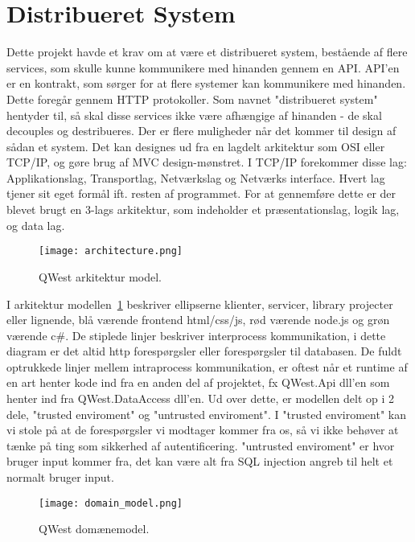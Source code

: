 \section{Distribueret System}\label{sec:distSys}
Dette projekt havde et krav om at være et distribueret system, bestående af flere services, som skulle kunne kommunikere med hinanden gennem en API. API'en er en kontrakt, som sørger for at flere systemer kan kommunikere med hinanden\cite{API}. Dette foregår gennem HTTP protokoller\cite{http}. 
Som navnet "distribueret system" hentyder til, så skal disse services ikke være afhængige af hinanden - de skal decouples\cite{decoupling} og destribueres. Der er flere muligheder når det kommer til design af sådan et system. Det kan designes ud fra en lagdelt arkitektur som OSI eller TCP/IP\cite{osi_tcp}, og gøre brug af MVC design-mønstret. I TCP/IP forekommer disse lag: Applikationslag, Transportlag, Netværkslag og Netværks interface. 
Hvert lag tjener sit eget formål ift. resten af programmet. 
For at gennemføre dette er der blevet brugt en 3-lags arkitektur, som indeholder et præsentationslag, logik lag, og data lag. 

\begin{figure}
    \texttt{[image: architecture.png]}
    \caption{QWest arkitektur model.}
    \label{fig:architecture_model}
\end{figure}

I arkitektur modellen~\ref{fig:architecture_model} beskriver ellipserne klienter, servicer, library projecter eller lignende, blå værende frontend html/css/js, rød værende node.js og grøn værende c\#. 
De stiplede linjer beskriver interprocess kommunikation, i dette diagram er det altid http forespørgsler eller forespørgsler til databasen.
De fuldt optrukkede linjer mellem intraprocess kommunikation, er oftest når et runtime af en art henter kode ind fra en anden del af projektet, fx QWest.Api dll'en som henter ind fra QWest.DataAccess dll'en.
Ud over dette, er modellen delt op i 2 dele, "trusted enviroment" og "untrusted enviroment". I "trusted enviroment" kan vi stole på at de forespørgsler vi modtager kommer fra os, så vi ikke behøver at tænke på ting som sikkerhed af autentificering. "untrusted enviroment" er hvor bruger input kommer fra, det kan være alt fra SQL injection angreb til helt et normalt bruger input.

\begin{figure}
    \texttt{[image: domain\_model.png]}
    \caption{QWest domænemodel.}
    \label{fig:domain_model}
\end{figure}

